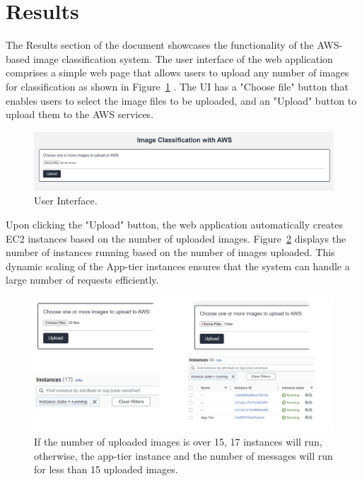 \documentclass[../main.tex]{subfiles}
\begin{document}
\part*{Results}

The Results section of the document showcases the functionality of the AWS-based image classification system. The user interface of the web application comprises a simple web page that allows users to upload any number of images for classification as shown in Figure~\ref{fig:ui} . The UI has a "Choose file" button that enables users to select the image files to be uploaded, and an "Upload" button to upload them to the AWS services.
\begin{figure}[h!]
\centering
\includegraphics[scale=0.36]{images/ui.png}
\caption{User Interface.}
\label{fig:ui}
\end{figure}

Upon clicking the "Upload" button, the web application automatically creates EC2 instances based on the number of uploaded images. Figure~\ref{fig:ins} displays the number of instances running based on the number of images uploaded. This dynamic scaling of the App-tier instances ensures that the system can handle a large number of requests efficiently.
\begin{figure}[h!]
\centering
\includegraphics[scale=0.65]{images/ins.png}
\caption{If the number of uploaded images is over 15, 17 instances will run, otherwise, the app-tier instance and the number of messages will run for less than 15 uploaded images.}
\label{fig:ins}
\end{figure}
\end{document}
